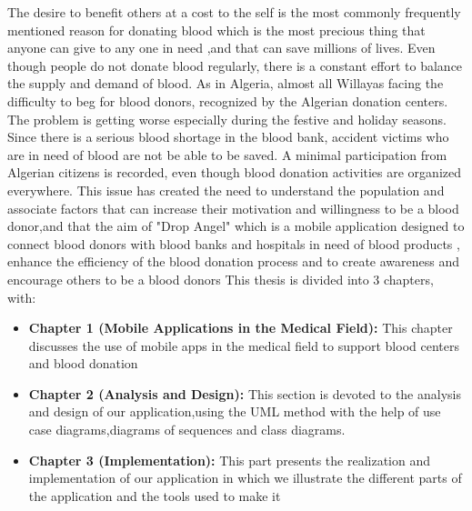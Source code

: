 The desire to benefit others at a cost to the self is the most commonly frequently mentioned reason for donating blood which is the most precious thing that anyone can give to any one in need ,and that can save millions of lives. Even though people do not donate blood regularly, there is a constant effort to balance the supply and demand of blood. 
As in Algeria, almost all Willayas facing the difficulty to beg for blood donors, recognized
by the Algerian donation centers. The problem is getting worse especially during the
festive and holiday seasons. Since there is a serious blood shortage in the blood bank, accident victims
who are in need of blood are not be able to be saved. A minimal participation from Algerian
citizens is recorded, even though blood donation activities are organized everywhere. This issue has created
the need to understand the population and associate factors that can increase their motivation
and willingness to be a blood donor,and that the aim of "Drop Angel" which is a mobile application 
 designed to connect blood donors with blood banks and hospitals in need of blood products , enhance the efficiency of the blood donation process and
to create awareness and encourage others to be a blood donors
This thesis is divided into 3 chapters\cite{uptodate}, with:
\newline


\begin{itemize}

\item \textbf {Chapter 1 (Mobile Applications in the Medical Field):}\newline
This chapter discusses the use of mobile apps in the medical field to support blood centers and blood donation


\item \textbf {Chapter 2 (Analysis and Design):}\newline
This section is devoted to the analysis and design of our application,using the UML method with the help of use case diagrams,diagrams of sequences and class diagrams.


\item \textbf {Chapter 3 (Implementation):} \newline
This part presents the realization and implementation of our application in which we illustrate the different parts of the application and the tools used to make it

\end{itemize}

